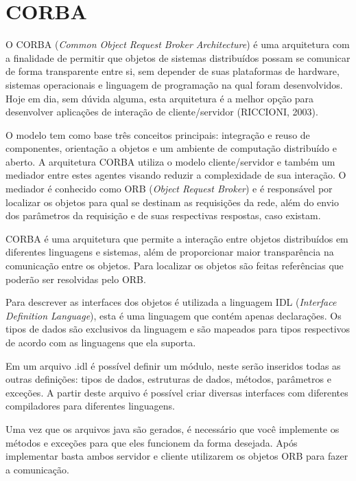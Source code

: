 \section{CORBA}
	O CORBA (\textit{Common Object Request Broker Architecture}) é uma arquitetura com a finalidade de permitir que objetos de sistemas distribuídos possam se comunicar de forma transparente entre si, sem depender de suas plataformas de hardware, sistemas operacionais e linguagem de programação na qual foram desenvolvidos. Hoje em dia, sem dúvida alguma, esta arquitetura é a melhor opção para desenvolver aplicações de interação de cliente/servidor (RICCIONI, 2003).
	
	O modelo tem como base três conceitos principais: integração e reuso de componentes, orientação a objetos e um ambiente de computação distribuído e aberto. A arquitetura CORBA utiliza o modelo cliente/servidor e também um mediador entre estes agentes visando reduzir a complexidade de sua interação. O mediador é conhecido como ORB (\textit{Object Request Broker}) e é responsável por localizar os objetos para qual se destinam as requisições da rede, além do envio dos parâmetros da requisição e de suas respectivas respostas, caso existam.

	CORBA é uma arquitetura que permite a interação entre objetos distribuídos em diferentes linguagens e sistemas, além de proporcionar maior transparência na comunicação entre os objetos. Para localizar os objetos são feitas referências que poderão ser resolvidas pelo ORB.
	
	Para descrever as interfaces dos objetos é utilizada a linguagem IDL (\textit{Interface Definition Language}), esta é uma linguagem que contém apenas declarações. Os tipos de dados são exclusivos da linguagem e são mapeados para tipos respectivos de acordo com as linguagens que ela suporta.
	
	Em um arquivo .idl é possível definir um módulo, neste serão inseridos todas as outras definições: tipos de dados, estruturas de dados, métodos, parâmetros e exceções. A partir deste arquivo é possível criar diversas interfaces com diferentes compiladores para diferentes linguagens.
	
	Uma vez que os arquivos java são gerados, é necessário que você implemente os métodos e exceções para que eles funcionem da forma desejada. Após implementar basta ambos servidor e  cliente utilizarem os objetos ORB para fazer a comunicação.

